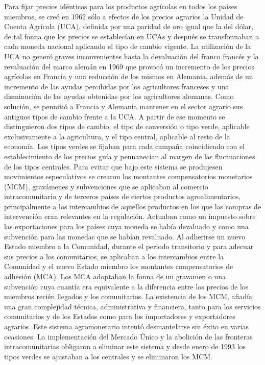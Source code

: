 \documentclass[10pt,a4paper]{article}
\begin{document}
Para fijar precios idénticos para los productos agrícolas en todos los países miembros, se creó en 1962 sólo a efectos de los precios agrarios la Unidad de Cuenta Agrícola (UCA), definida por una paridad de oro igual que la del dólar, de tal fonna que los precios se establecían en UCAs y después se transfonnaban a cada moneda nacional aplicando el tipo de cambio vigente. La utilización de la UCA no generó graves inconvenientes hasta la devaluación del franco francés y la revaluación del marco alemán en 1969 que provocó un incremento de los precios agrícolas en Francia y una reducción de los mismos en Alemania, además de un incremento de las ayudas percibidas por los agricultores franceses y una disminución de las ayudas obtenidas por los agricultores alemanas. Como solución, se pennitió a Francia y Alemania mantener en el sector agrario sus antiguos tipos de cambio frente a la UCA. A partir de ese momento se distinguieron dos tipos de cambio, el tipo de conversión o tipo verde, aplicable exclusivamente a la agricultura, y el tipo central, aplicable al resto de la economía. Los tipos verdes se fijaban para cada campaña coincidiendo con el establecimiento de los precios guía y pennanecían al margen de las fluctuaciones de los tipos centrales. Para evitar que bajo este sistema se produjesen movimientos especulativos se crearon los montantes compensatorios monetarios (MCM), gravámenes y subvenciones que se aplicaban al comercio intracomunitario y de terceros países de ciertos productos agroalimentarios, principalmente a los intercambios de aquellos productos en los que las compras de intervención eran relevantes en la regulación. Actuaban como un impuesto sobre las exportaciones para los países cuya moneda se había devaluado y como una subvención para las monedas que se habían revaluado. Al adherirse un nuevo Estado miembro a la Comunidad, durante el periodo transitorio y para adecuar sus precios a los comunitarios, se aplicaban a los intercambios entre la Comunidad y el nuevo Estado miembro los montantes compensatorios de adhesión (MCA). Los MCA adoptaban la fonna de un gravamen o una subvención cuya cuantía era equivalente a la diferencia entre los precios de los miembros recién llegados y los comunitarios. La existencia de los MCM, afiadía una gran complejidad técnica, administrativa y financiera, tanto para los servicios comunitarios y de los Estados como para los importadores y exportadores agrarios. Este sistema agromonetario intentó desmantelarse sin éxito en varias ocasiones. La implementación del Mercado Único y la abolición de las fronteras intracomunitarias obligaron a eliminar este sistema y desde enero de 1993 los tipos verdes se ajustaban a los centrales y se eliminaron los MCM.
\end{document}
